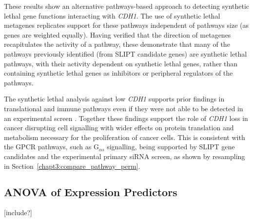 These results show an alternative \glspl{pathway}-based approach to detecting \gls{synthetic lethal} gene functions interacting with \textit{CDH1}. The use of \gls{synthetic lethal} \glspl{metagene} replicates support for these \glspl{pathway} independent of \glspl{pathway} size (as genes are weighted equally). Having verified that the direction of \glspl{metagene} recapitulates the activity of a \gls{pathway}, these demonstrate that many of the \glspl{pathway} previously identified (from \gls{SLIPT} candidate genes) are \gls{synthetic lethal} \glspl{pathway}, with their activity dependent on \gls{synthetic lethal} genes, rather than containing \gls{synthetic lethal} genes as inhibitors or peripheral regulators of the \glspl{pathway}.


The \gls{synthetic lethal} analysis against low \textit{CDH1}  supports prior findings in translational and immune \glspl{pathway} even if they were not able to \textcolor{black}{be} detected in an experimental screen \citep{Telford2015}. Together these findings support the role of \textit{CDH1} loss in cancer disrupting cell signalling with wider effects on protein translation and metabolism necessary for the proliferation of cancer cells. This is consistent with the \gls{GPCR} \glspl{pathway}, such as G$_{\alpha s}$ signalling, being supported by \gls{SLIPT} gene candidates and the experimental primary \gls{siRNA} screen, as shown by resampling in Section~\ref{chapt3:compare_pathway_perm}.


\FloatBarrier



\iffalse
\subsection{ANOVA of Expression Predictors}
[include?]

